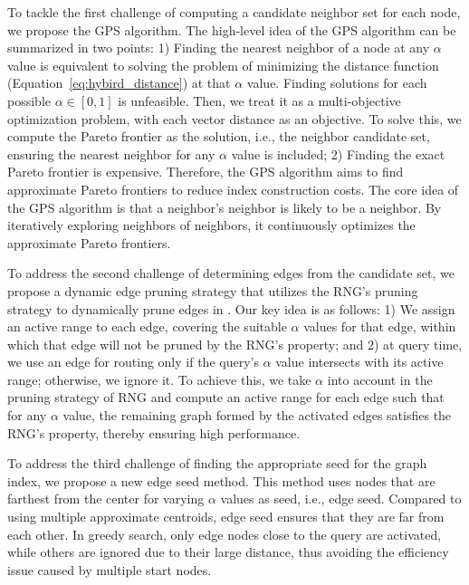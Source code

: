 To tackle the first challenge of computing a candidate neighbor set for each node, %
we propose %
the GPS algorithm. The high-level idea of the GPS algorithm can be summarized in two points: 1) Finding the nearest neighbor of a node at any $\alpha$ value is equivalent to solving the problem of minimizing the distance function (Equation~\ref{eq:hybird_distance}) at that $\alpha$ value. Finding solutions for each possible $\alpha \in [0, 1]$ is unfeasible. Then, we treat it as a multi-objective optimization problem, with each vector distance as an objective. %
To solve this, we 
compute the Pareto frontier as the solution, i.e., the neighbor candidate set, ensuring the nearest neighbor for any $\alpha$ value is included; 2) Finding the exact Pareto frontier is expensive.
Therefore, the GPS algorithm aims to find approximate Pareto frontiers to reduce index construction costs. The core idea of the GPS algorithm is that a neighbor’s neighbor is likely to be a neighbor. By iteratively exploring neighbors of neighbors, it continuously optimizes the approximate Pareto frontiers.

To address the second challenge of determining edges from the candidate set, we propose a dynamic edge pruning strategy that utilizes the RNG's pruning strategy to dynamically prune edges in \method.
Our key idea is as follows: 1) We assign an active range to each edge, covering the suitable $\alpha$ values for that edge, within which that edge will not be pruned by the RNG's property; and 2) at query time, we use an edge for routing only if the query's $\alpha$ value intersects with its active range; otherwise, we ignore it. To achieve this, we take $\alpha$ into account in the pruning strategy of RNG and compute an active range for each edge such that for any $\alpha$ value, the remaining graph formed by the activated edges satisfies the RNG's property, thereby ensuring high performance. 

To address the third challenge of finding the appropriate seed for the graph index, we propose a new edge seed method. This method uses nodes that are farthest from the center for varying $\alpha$ values as seed, i.e., edge seed. Compared to using multiple approximate centroids, edge seed ensures that they are far from each other. In greedy search, only edge nodes close to the query are activated, while others are ignored due to their large distance, thus avoiding the efficiency issue caused by multiple start nodes.


